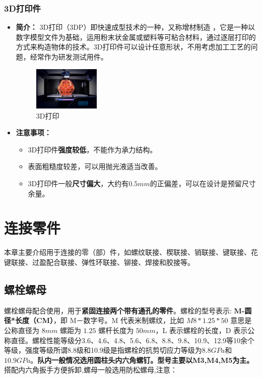 \documentclass[UTF8]{article} %
\begin{document}
\subsubsection{3D打印件}

\begin{itemize}
  \item \textbf{简介：} 3D打印（3DP）即快速成型技术的一种，又称增材制造 ，它是一种以数字模型文件为基础，运用粉末状金属或塑料等可粘合材料，通过逐层打印的方式来构造物体的技术。3D打印件可以设计任意形状，不用考虑加工工艺的问题，经常作为研发测试用件。
  
  \begin{figure}[h]
    \centering
    \includegraphics[width=0.3\textwidth]{3.png}
    \caption{3D打印}
  \end{figure}

  \item \textbf{注意事项：} 
  \begin{itemize}
    \item 3D打印件\textbf{强度较低}，不能作为承力结构。
    \item 表面粗糙度较差，可以用抛光液适当改善。
    \item 3D打印件一般\textbf{尺寸偏大}，大约有$0.5mm$的正偏差，可以在设计是预留尺寸余量。

  \end{itemize}

\end{itemize}

\section{连接零件}
本章主要介绍用于连接的零（部）件，如螺纹联接、楔联接、销联接、键联接、花键联接、过盈配合联接、弹性环联接、铆接、焊接和胶接等。
\subsection{螺栓螺母}
螺栓螺母配合使用，用于\textbf{紧固连接两个带有通孔的零件}。螺栓的型号表示: \textbf{M-圆径*长度（CM）}，即 M－数字号。M 代表米制螺纹，比如 $M8*1.25*50$ 意思是公称直径为 $8mm$ 螺距为 $1.25$ 螺杆长度为 $50mm$，L 表示螺栓的长度，D 表示公称直径。螺栓性能等级分3.6、4.6、4.8、5.6、6.8、8.8、9.8、10.9、12.9等10余个等级，强度等级所谓8.8级和10.9级是指螺栓的抗剪切应力等级为$8.8GPa$和$10.9GPa$。\textbf{队内一般情况选用圆柱头内六角螺钉。型号主要以M3,M4,M5为主。}搭配内六角扳手方便拆卸,螺母一般选用防松螺母,注意：
\end{document}
